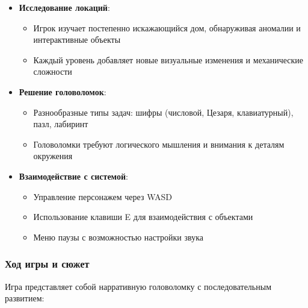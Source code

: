 \documentclass{article}
\begin{document}
\begin{itemize}
    \item \textbf{Исследование локаций}:
    \begin{itemize}
        \item Игрок изучает постепенно искажающийся дом, обнаруживая аномалии и интерактивные объекты
        \item Каждый уровень добавляет новые визуальные изменения и механические сложности
    \end{itemize}
    
    \item \textbf{Решение головоломок}:
    \begin{itemize}
        \item Разнообразные типы задач: шифры (числовой, Цезаря, клавиатурный), пазл, лабиринт
        \item Головоломки требуют логического мышления и внимания к деталям окружения
    \end{itemize}
    
    \item \textbf{Взаимодействие с системой}:
    \begin{itemize}
        \item Управление персонажем через WASD
        \item Использование клавиши E для взаимодействия с объектами
        \item Меню паузы с возможностью настройки звука
    \end{itemize}
\end{itemize}

\subsubsection{Ход игры и сюжет}
Игра представляет собой нарративную головоломку с последовательным развитием:
\end{document}
